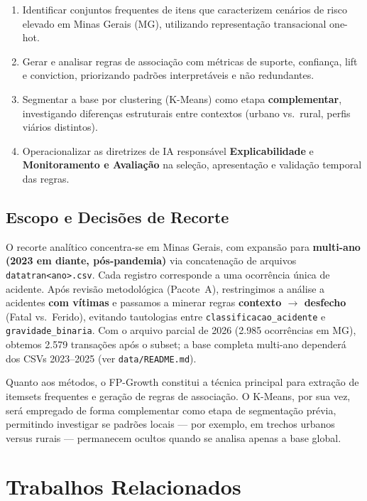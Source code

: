 \documentclass[12pt]{article}
\begin{document}
\begin{enumerate}[leftmargin=*]
    \item Identificar conjuntos frequentes de itens que caracterizem cenários de risco elevado em Minas Gerais (MG), utilizando representação transacional one-hot.
    \item Gerar e analisar regras de associação com métricas de suporte, confiança, lift e conviction, priorizando padrões interpretáveis e não redundantes.
    \item Segmentar a base por clustering (K-Means) como etapa \textbf{complementar}, investigando diferenças estruturais entre contextos (urbano vs.\ rural, perfis viários distintos).
    \item Operacionalizar as diretrizes de IA responsável \textbf{Explicabilidade} e \textbf{Monitoramento e Avaliação} na seleção, apresentação e validação temporal das regras.
\end{enumerate}

\subsection{Escopo e Decisões de Recorte}

O recorte analítico concentra-se em Minas Gerais, com expansão para \textbf{multi-ano (2023 em diante, pós-pandemia)} via concatenação de arquivos \texttt{datatran<ano>.csv}. Cada registro corresponde a uma ocorrência única de acidente. Após revisão metodológica (Pacote~A), restringimos a análise a acidentes \textbf{com vítimas} e passamos a minerar regras \textbf{contexto $\rightarrow$ desfecho} (Fatal vs.\ Ferido), evitando tautologias entre \texttt{classificacao\_acidente} e \texttt{gravidade\_binaria}. Com o arquivo parcial de 2026 (2.985 ocorrências em MG), obtemos 2.579 transações após o subset; a base completa multi-ano dependerá dos CSVs 2023--2025 (ver \texttt{data/README.md}).

Quanto aos métodos, o FP-Growth constitui a técnica principal para extração de itemsets frequentes e geração de regras de associação. O K-Means, por sua vez, será empregado de forma complementar como etapa de segmentação prévia, permitindo investigar se padrões locais --- por exemplo, em trechos urbanos versus rurais --- permanecem ocultos quando se analisa apenas a base global.

\section{Trabalhos Relacionados}
\end{document}
